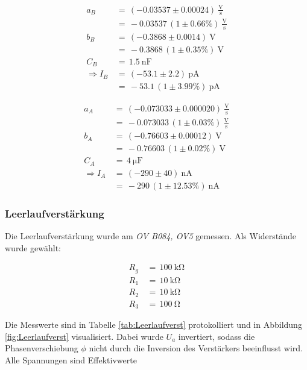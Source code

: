 \documentclass[10pt,a4paper]{scrartcl}
\begin{document}
\begin{align*}
    a_B \,&=\, \left(-0.03537\pm 0.00024\right)~\mathrm{\frac{V}{s}}\\
          &=\, -0.03537 \, \left(1\pm0.66\%\right)~\mathrm{\frac{V}{s}}\\
    b_B \,&=\, \left(-0.3868 \pm 0.0014\right)~\mathrm V\\
          &=\, -0.3868 \, \left(1\pm 0.35\%\right)~\mathrm V\\
    C_B \,&=\,1.5~\mathrm{nF}\\
    \Rightarrow
    I_B \,&=\, \left(-53.1\pm2.2\right)~\mathrm{pA}\\
    &=\, -53.1\,\left(1\pm3.99\%\right)~\mathrm{pA}
\end{align*}

\begin{align*}
    a_A \,&=\, \left(-0.073033\pm 0.000020\right)~\mathrm{\frac{V}{s}}\\
          &=\, -0.073033 \, \left(1\pm0.03\%\right)~\mathrm{\frac{V}{s}}\\
    b_A \,&=\, \left(-0.76603 \pm 0.00012\right)~\mathrm V\\
          &=\, -0.76603 \, \left(1\pm 0.02\%\right)~\mathrm V\\
    C_A \,&=\,4~\mathrm{\mu F}\\
    \Rightarrow
    I_A \,&=\, \left(-290\pm40\right)~\mathrm{nA}\\
    &=\, -290\,\left(1\pm12.53\%\right)~\mathrm{nA}
\end{align*}

\subsubsection {Leerlaufverstärkung}

Die Leerlaufverstärkung wurde am \emph{OV B084, OV5} gemessen.
Als Widerstände wurde gewählt:

\begin{align*}
    R_g\,&=\,100~\mathrm{k\Omega}\\
    R_1\,&=\,10~\mathrm{k\Omega}\\
    R_2\,&=\,10~\mathrm{k\Omega}\\
    R_3\,&=\,100~\mathrm{\Omega}
\end{align*}

Die Messwerte sind in Tabelle \ref{tab:Leerlaufverst} protokolliert
und in Abbildung \ref{fig:Leerlaufverst} visualisiert.
Dabei wurde $U_a$ invertiert,
sodass die Phasenverschiebung $\phi$ nicht durch die Inversion des
Verstärkers beeinflusst wird.
Alle Spannungen sind Effektivwerte
\end{document}
